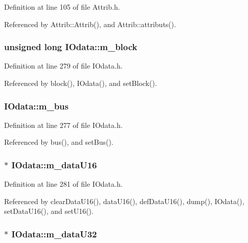 Definition at line 105 of file Attrib.h.

Referenced by Attrib::Attrib(), and Attrib::attributs().\hypertarget{classIOdata_a6d1ce9f88db6b97ce61098a3693e253f}{
\subsubsection[{m\_\-block}]{\setlength{\rightskip}{0pt plus 5cm}unsigned long {\bf IOdata::m\_\-block}}}
\label{classIOdata_a6d1ce9f88db6b97ce61098a3693e253f}


Definition at line 279 of file IOdata.h.

Referenced by block(), IOdata(), and setBlock().\hypertarget{classIOdata_a42c07a9b3f43ec35dd18d13a67d294cc}{
\subsubsection[{m\_\-bus}]{ {\bf IOdata::m\_\-bus}}}
\label{classIOdata_a42c07a9b3f43ec35dd18d13a67d294cc}


Definition at line 277 of file IOdata.h.

Referenced by bus(), and setBus().\hypertarget{classIOdata_a8d698e077b7898009691b9086a3e6453}{
\subsubsection[{m\_\-dataU16}]{$\ast$ {\bf IOdata::m\_\-dataU16}}}
\label{classIOdata_a8d698e077b7898009691b9086a3e6453}


Definition at line 281 of file IOdata.h.

Referenced by clearDataU16(), dataU16(), defDataU16(), dump(), IOdata(), setDataU16(), and setU16().\hypertarget{classIOdata_a247cdaefd87084e3cad1d530d592d99a}{
\subsubsection[{m\_\-dataU32}]{$\ast$ {\bf IOdata::m\_\-dataU32}}}
\label{classIOdata_a247cdaefd87084e3cad1d530d592d99a}


